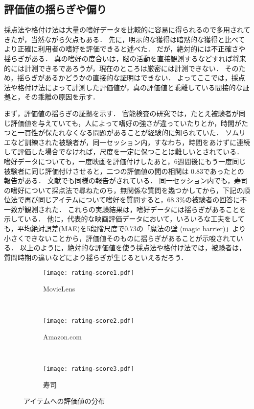 \subsection{評価値の揺らぎや偏り}

採点法や格付け法は大量の嗜好データを比較的に容易に得られるので多用されてきたが，当然ながら欠点もある．
先に，明示的な獲得は暗黙的な獲得と比べてより正確に利用者の嗜好を評価できると述べた．
だが，絶対的には不正確さや揺らぎがある．
真の嗜好の度合いは，脳の活動を直接観測するなどすれば将来的には計測できるであろうが，現在のところは厳密には計測できない．
そのため，揺らぎがあるかどうかの直接的な証明はできない．
よってここでは，採点法や格付け法によって計測した評価値が，真の評価値と乖離している間接的な証拠と，その乖離の原因を示す．

まず，評価値の揺らぎの証拠を示す．
官能検査の研究では，たとえ被験者が同じ評価値を与えていても，人によって嗜好の強さが違っていたりとか，時間がたつと一貫性が保たれなくなる問題があることが経験的に知られていた\cite{lncs:04:01}．
ソムリエなど訓練された被験者が，同一セッション内，すなわち，時間をあけずに連続して評価した場合でなければ，尺度を一定に保つことは難しいとされている．
嗜好データについても，一度映画を評価付けしたあと，6週間後にもう一度同じ被験者に同じ評価付けさせると，二つの評価値の間の相関は
0.83であったとの報告がある\cite{sigchi:95:01}．
文献\cite{sigchi:03:02}でも同様の報告がされている．
同一セッション内でも，寿司の嗜好について採点法で尋ねたのち，無関係な質問を幾つかしてから，下記の順位法で再び同じアイテムについて嗜好を質問すると，68.3\%の被験者の回答に不一致が観測された\cite{jpublist:043}．
これらの実験結果は，嗜好データには揺らぎがあることを示している．
他に，代表的な映画評価データにおいて，いろいろな工夫をしても，平均絶対誤差(MAE)を5段階尺度で0.73の「魔法の壁 (magic barrier)」より小さくできないことから，評価値そのものに揺らぎがあることが示唆されている\cite{jacm:04:01}．
以上のように，絶対的な評価値を使う採点法や格付け法では，被験者は，質問時期の違いなどにより揺らぎが生じるといえるだろう．

\begin{figure}
\centering
\begin{subfigure}{0.6\linewidth}
\centering
\texttt{[image: rating-score1.pdf]}
\caption{MovieLens \cite{url:008}}\label{fig:prefdist:a}
\end{subfigure}\\\medskip
\begin{subfigure}{0.6\linewidth}
\centering
\texttt{[image: rating-score2.pdf]}
\caption{Amazon.com \cite{misc:007}}\label{fig:prefdist:b}
\end{subfigure}\\\medskip
\begin{subfigure}{0.6\linewidth}
\centering
\texttt{[image: rating-score3.pdf]}
\caption{寿司 \cite{url:020}}\label{fig:prefdist:c}
\end{subfigure}
\caption{アイテムへの評価値の分布}
\label{fig:prefdist}
\end{figure}

